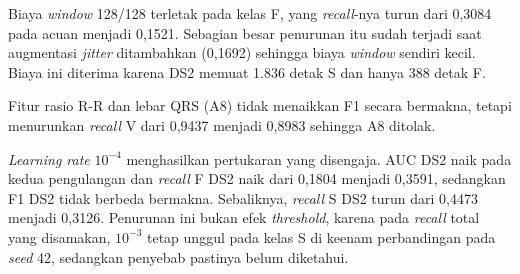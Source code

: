 Biaya \textit{window} 128/128 terletak pada kelas F, yang \textit{recall}-nya turun dari 0,3084 pada acuan menjadi 0,1521. Sebagian besar penurunan itu sudah terjadi saat augmentasi \textit{jitter} ditambahkan (0,1692) sehingga biaya \textit{window} sendiri kecil. Biaya ini diterima karena DS2 memuat 1.836 detak S dan hanya 388 detak F.

Fitur rasio R-R dan lebar QRS (A8) tidak menaikkan F1 secara bermakna, tetapi menurunkan \textit{recall} V dari 0,9437 menjadi 0,8983 sehingga A8 ditolak.


\textit{Learning rate} $10^{-4}$ menghasilkan pertukaran yang disengaja. AUC DS2 naik pada kedua pengulangan dan \textit{recall} F DS2 naik dari 0,1804 menjadi 0,3591, sedangkan F1 DS2 tidak berbeda bermakna. Sebaliknya, \textit{recall} S DS2 turun dari 0,4473 menjadi 0,3126. Penurunan ini bukan efek \textit{threshold}, karena pada \textit{recall} total yang disamakan, $10^{-3}$ tetap unggul pada kelas S di keenam perbandingan pada \textit{seed} 42, sedangkan penyebab pastinya belum diketahui.

